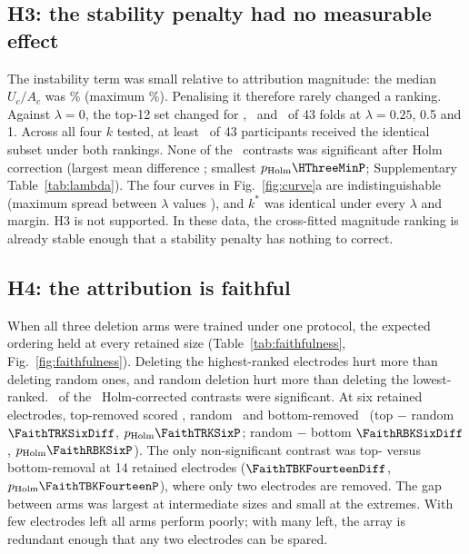 \subsection{H3: the stability penalty had no measurable effect}
The instability term was small relative to attribution magnitude: the median $U_c/A_c$ was \UOverAMedian\% (maximum \UOverAMax\%). Penalising it therefore rarely changed a ranking. Against $\lambda = 0$, the top-12 set changed for \TopTwelveDiffersLambdaPtTwoFive, \TopTwelveDiffersLambdaPtFive\ and \TopTwelveDiffersLambdaOne\ of 43 folds at $\lambda = 0.25$, 0.5 and 1. Across all four $k$ tested, at least \HThreeMinTied\ of 43 participants received the identical subset under both rankings. None of the \HThreeNTests\ contrasts was significant after Holm correction (largest mean difference \HThreeMaxAbsDiff; smallest $p_{\mathrm{Holm}} \HThreeMinP$; Supplementary Table~\ref{tab:lambda}). The four curves in Fig.~\ref{fig:curve}a are indistinguishable (maximum spread between $\lambda$ values \LambdaCurveMaxSpread), and $k^*$ was identical under every $\lambda$ and margin. H3 is not supported. In these data, the cross-fitted magnitude ranking is already stable enough that a stability penalty has nothing to correct.

\subsection{H4: the attribution is faithful}
When all three deletion arms were trained under one protocol, the expected ordering held at every retained size (Table~\ref{tab:faithfulness}, Fig.~\ref{fig:faithfulness}). Deleting the highest-ranked electrodes hurt more than deleting random ones, and random deletion hurt more than deleting the lowest-ranked. \FaithNSig\ of the \FaithNTests\ Holm-corrected contrasts were significant. At six retained electrodes, top-removed scored \FaithTopKSix, random \FaithRandomKSix\ and bottom-removed \FaithBottomKSix\ (top $-$ random $\FaithTRKSixDiff$, $p_{\mathrm{Holm}} \FaithTRKSixP$; random $-$ bottom $\FaithRBKSixDiff$, $p_{\mathrm{Holm}} \FaithRBKSixP$). The only non-significant contrast was top- versus bottom-removal at 14 retained electrodes ($\FaithTBKFourteenDiff$, $p_{\mathrm{Holm}} \FaithTBKFourteenP$), where only two electrodes are removed. The gap between arms was largest at intermediate sizes and small at the extremes. With few electrodes left all arms perform poorly; with many left, the array is redundant enough that any two electrodes can be spared.

